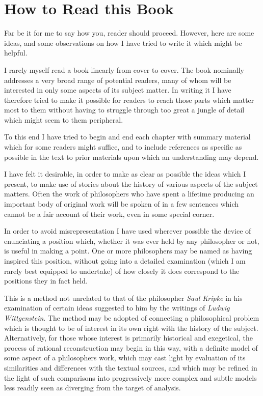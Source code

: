 \section{How to Read this Book}

Far be it for me to say how you, reader should proceed.
However, here are some ideas, and some observations on how I have
tried to write it which might be helpful.

I rarely myself read a book linearly from cover to cover.
The book nominally addresses a very broad range of potential readers,
many of whom will be interested in only some aspects of its subject
matter.
In writing it I have therefore tried to make it possible for readers
to reach those parts which matter most to them without having to
struggle through too great a jungle of detail which might seem to them
peripheral.

To this end I have tried to begin and end each chapter with summary
material which for some readers might suffice, and to include 
references as specific as possible in the text to prior materials upon
which an understanding may depend.

I have felt it desirable, in order to make as clear as possible the
ideas which I present, to make use of stories about the history of
various aspects of the subject matters.
Often the work of philosophers who have spent a lifetime producing an
important body of original work will be spoken of in a few sentences
which cannot be a fair account of their work, even in some special
corner.

In order to avoid misrepresentation I have used wherever possible the
device of enunciating a position which, whether it was ever held by
any philosopher or not, is useful in making a point.
One or more philosophers may be named as having inspired this
position, without going into a detailed examination (which I am
rarely best equipped to undertake) of how closely it does correspond to
the positions they in fact held.

This is a method not unrelated to that of the philosopher {\it Saul
  Kripke} in his examination of certain ideas suggested to him by the
writings of {\it Ludwig Wittgenstein}.
The method may be adopted of connecting a philosophical problem which
is thought to be of interest in its own right with the history of the
subject.
Alternatively, for those whose interest is primarily historical and
exegetical, the process of rational reconstruction may begin in this
way, with a definite model of some aspect of a philosophers work,
which may cast light by evaluation of its similarities and differences
with the textual sources, and which may be refined in the light of
such comparisons into progressively more complex and subtle models
less readily seen as diverging from the target of analysis.

